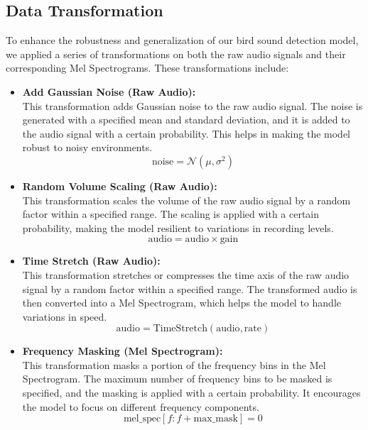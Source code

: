       \subsection{Data Transformation}
      To enhance the robustness and generalization of our bird sound detection model, we applied a series of transformations on both the raw audio signals and their corresponding Mel Spectrograms. These transformations include:

      \begin{itemize}
            \item \textbf{Add Gaussian Noise (Raw Audio):}\\
            This transformation adds Gaussian noise to the raw audio signal. The noise is generated with a specified mean and standard deviation, and it is added to the audio signal with a certain probability. This helps in making the model robust to noisy environments.
            \begin{equation}
            \text{noise} = \mathcal{N}(\mu, \sigma^2)
            \end{equation}

            \item \textbf{Random Volume Scaling (Raw Audio):}\\
            This transformation scales the volume of the raw audio signal by a random factor within a specified range. The scaling is applied with a certain probability, making the model resilient to variations in recording levels.
            \begin{equation}
            \text{audio} = \text{audio} \times \text{gain}
            \end{equation}
            
            \item \textbf{Time Stretch (Raw Audio):}\\
            This transformation stretches or compresses the time axis of the raw audio signal by a random factor within a specified range. The transformed audio is then converted into a Mel Spectrogram, which helps the model to handle variations in speed.
            \begin{equation}
            \text{audio} = \text{TimeStretch}(\text{audio}, \text{rate})
            \end{equation}
            
            \item \textbf{Frequency Masking (Mel Spectrogram):}\\
            This transformation masks a portion of the frequency bins in the Mel Spectrogram. The maximum number of frequency bins to be masked is specified, and the masking is applied with a certain probability. It encourages the model to focus on different frequency components.
            \begin{equation}
            \text{mel\_spec}[f:f+\text{max\_mask}] = 0
            \end{equation}


\end{itemize}
